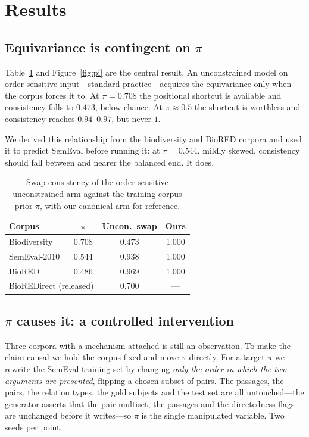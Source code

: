 \documentclass[11pt]{article}
\begin{document}
\section{Results}
\label{sec:results}

\subsection{Equivariance is contingent on $\pi$}
\label{sec:res-contingency}
Table~\ref{tab:contingency} and Figure~\ref{fig:pi} are the central result. An unconstrained model on order-sensitive
input---standard practice---acquires the equivariance only when the corpus forces it to. At
$\pi = 0.708$ the positional shortcut is available and consistency falls to $0.473$, below
chance. At $\pi \approx 0.5$ the shortcut is worthless and consistency reaches $0.94$--$0.97$,
but never $1$.

We derived this relationship from the biodiversity and BioRED corpora and used it to predict
SemEval before running it: at $\pi = 0.544$, mildly skewed, consistency should fall between and
nearer the balanced end. It does.

\begin{table}[t]
\centering\small
\begin{tabular}{lccc}
\toprule
Corpus & $\pi$ & Uncon.\ swap & Ours \\
\midrule
Biodiversity & 0.708 & 0.473 & 1.000 \\
SemEval-2010 & 0.544 & 0.938 & 1.000 \\
BioRED       & 0.486 & 0.969 & 1.000 \\
\midrule
\multicolumn{2}{l}{BioREDirect (released)} & 0.700 & --- \\
\bottomrule
\end{tabular}
\caption{Swap consistency of the order-sensitive unconstrained arm against the training-corpus
prior $\pi$, with our canonical arm for reference.}
\label{tab:contingency}
\end{table}

\subsection{$\pi$ causes it: a controlled intervention}
\label{sec:res-intervention}
Three corpora with a mechanism attached is still an observation. To make the claim causal we
hold the corpus fixed and move $\pi$ directly. For a target $\pi$ we rewrite the SemEval
training set by changing \emph{only the order in which the two arguments are presented},
flipping a chosen subset of pairs. The passages, the pairs, the relation types, the gold
subjects and the test set are all untouched---the generator asserts that the pair multiset, the
passages and the directedness flags are unchanged before it writes---so $\pi$ is the single
manipulated variable. Two seeds per point.
\end{document}
